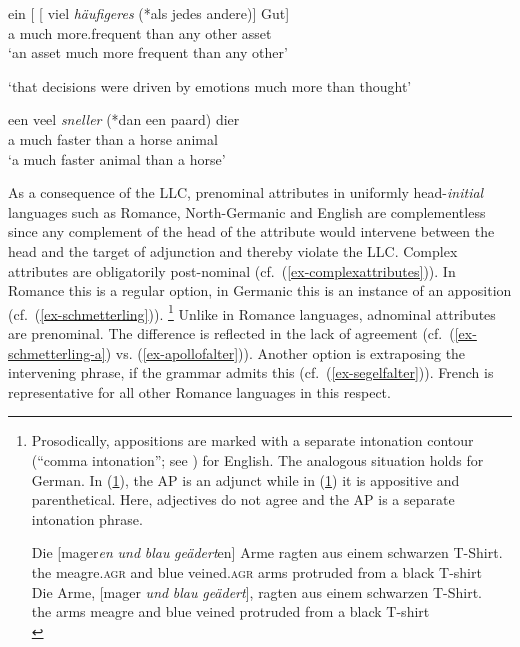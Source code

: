 \documentclass[output=paper
  ,nobabel
  ,uniformtopskip %
]{langscibook}
\begin{document}
\ex
\gll ein [ [ viel \emph{häufigeres} (*als jedes andere)] Gut] \\
     a   {}        {}        much more.frequent \hphantom{(*}than any other asset \\
\glt `an asset much more frequent than any other'

\ex\label{ex-beslissingen}
\glt `that decisions were driven by emotions much more than thought'

\ex\label{ex-dier}
\gll  een veel \emph{sneller} (*dan een paard) dier  \\
a much faster \hphantom{(*}than a horse animal\\
\glt `a much faster animal than a horse'

\zl

\noindent
As a consequence of the LLC, prenominal attributes in uniformly head-\emph{initial} languages such as Romance, North-Germanic and English are complementless since any complement of the head of the attribute would intervene between the head and the target of adjunction and thereby violate the LLC. Complex attributes are obligatorily post-nominal (cf.\ (\ref{ex-complexattributes})). In Romance this is a regular option, in Germanic this is an instance of an apposition (cf.\ (\ref{ex-schmetterling})).%
%
\footnote{Prosodically, appositions are marked with a separate intonation contour (``comma intonation''; see \citealp[Section~2.3.3]{Dehe2014}) for English. The analogous situation holds for German. In (\ref{ex-mager}), the AP is an adjunct while in (\ref{ex-arme}) it is appositive and parenthetical. Here, adjectives do not agree and the AP is a separate intonation phrase.
	
\ea\label{ex-mager} 
\gll Die [mager\emph{en} \emph{und} \emph{blau} \emph{geädert}en] Arme ragten aus einem schwarzen T-Shirt. \\ 
     the \spacebr{}meagre\textsc{.agr} and blue veined\textsc{.agr} arms protruded from a black T-shirt \\
\ex\label{ex-arme} 
\gll Die Arme, [mager \emph{und} \emph{blau} \emph{geädert}], ragten aus einem schwarzen T-Shirt. \\ 
     the arms \spacebr{}meagre and blue veined protruded from a black T-shirt \\
\z
}
Unlike in Romance languages, adnominal attributes are prenominal. The difference is reflected in the lack of agreement (cf.\ (\ref{ex-schmetterling-a}) vs. (\ref{ex-apollofalter})). Another option is extraposing the intervening phrase, if the grammar admits this (cf.\ (\ref{ex-segelfalter})). French is representative for all other Romance languages in this respect.
\end{document}

